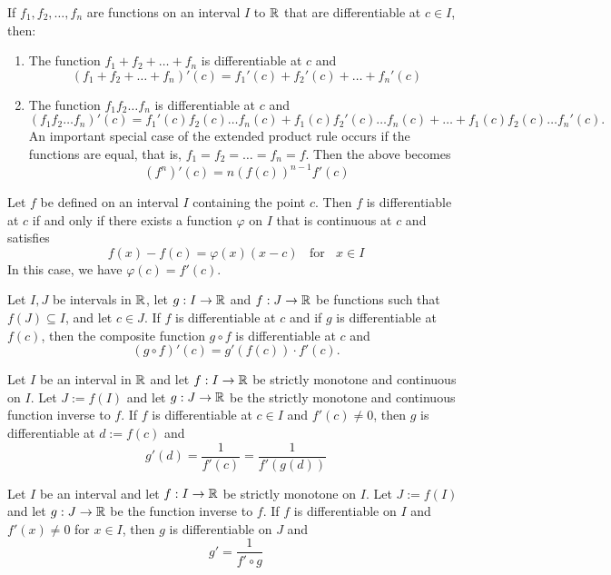 \begin{corollary}
	If $f_1, f_2, \dots, f_n$ are functions on an interval $I$ to $\mathbb{R}$ that are differentiable at $c \in I$, then:
	\begin{enumerate}
		\item The function $f_1 + f_2 + \dots + f_n$ is differentiable at $c$ and
		      \[(f_1 + f_2 + \dots + f_n)'(c) = f_1'(c) + f_2'(c) + \dots + f_n'(c)\]

		\item The function $f_1f_2 \dots f_n$ is differentiable at $c$ and
		      \[(f_1f_2 \dots f_n)'(c) = f_1'(c)f_2(c) \dots f_n(c)+f_1(c)f_2'(c) \dots f_n(c) + \dots + f_1(c)f_2(c) \dots f_n'(c).\]
		      An important special case of the extended product rule occurs if the functions are equal, that is, $f_1 = f_2 = \dots = f_n = f$. Then the above becomes
		      \[(f^n)'(c) = n(f(c))^{n-1}f'(c)\]
	\end{enumerate}
\end{corollary}

\begin{theorem}
	Let $f$ be defined on an interval $I$ containing the point $c$. Then $f$ is differentiable at $c$ if and only if there exists a function $\varphi$ on $I$ that is continuous at $c$ and satisfies
	\[f(x)-f(c)=\varphi (x)(x-c)\ \ \ \ \text{for}\ \ \ \ x \in I\]
	In this case, we have $\varphi (c)=f'(c)$.
\end{theorem}

\begin{theorem}
	Let $I, J$ be intervals in $\mathbb{R}$, let $g:I \rightarrow \mathbb{R}$ and $f:J \rightarrow \mathbb{R}$ be functions such that $f(J) \subseteq I$, and let $c \in J$. If $f$ is differentiable at $c$ and if $g$ is differentiable at $f(c)$, then the composite function $g \circ f$ is differentiable at $c$ and
	\[(g \circ f)'(c) = g'(f(c)) \cdot f'(c).\]
\end{theorem}

\begin{theorem}
	Let $I$ be an interval in $\mathbb{R}$ and let $f:I \rightarrow \mathbb{R}$ be strictly monotone and continuous on $I$. Let $J:=f(I)$ and let $g:J \rightarrow \mathbb{R}$ be the strictly monotone and continuous function inverse to $f$. If $f$ is differentiable at $c \in I$ and $f'(c) \neq0$, then $g$ is differentiable at $d:=f(c)$ and
	\[g'(d)=\frac{1}{f'(c)}=\frac{1}{f'(g(d))}\]
\end{theorem}

\begin{theorem}
	Let $I$ be an interval and let $f:I \rightarrow \mathbb{R}$ be strictly monotone on $I$. Let $J:= f(I)$ and let $g:J \rightarrow \mathbb{R}$ be the function inverse to $f$. If $f$ is differentiable on $I$ and $f'(x) \neq 0$ for $x \in I$, then $g$ is differentiable on $J$ and
	\[g' = \frac{1}{f' \circ g}\]
\end{theorem}
